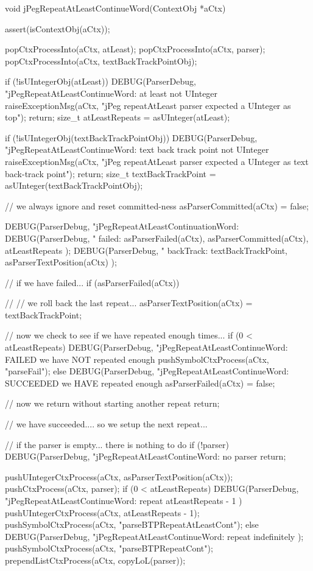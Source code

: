 \startCCode
void jPegRepeatAtLeastContinueWord(ContextObj *aCtx) {
  assert(isContextObj(aCtx));
  
  popCtxProcessInto(aCtx, atLeast);
  popCtxProcessInto(aCtx, parser);
  popCtxProcessInto(aCtx, textBackTrackPointObj);

  if (!isUIntegerObj(atLeast)) {
    DEBUG(ParserDebug,
      "jPegRepeatAtLeastContinueWord: at least not UInteger%
    raiseExceptionMsg(aCtx,
      "jPeg repeatAtLeast parser expected a UInteger as top");
    return;
  }
  size_t atLeastRepeats = asUInteger(atLeast);

  if (!isUIntegerObj(textBackTrackPointObj)) {
    DEBUG(ParserDebug,
      "jPegRepeatAtLeastContinueWord: text back track point not UInteger%
    raiseExceptionMsg(aCtx,
      "jPeg repeatAtLeast parser expected a UInteger as text back-track point");
    return;
  }
  size_t textBackTrackPoint = asUInteger(textBackTrackPointObj);

  // we always ignore and reset committed-ness
  asParserCommitted(aCtx) = false;

  DEBUG(ParserDebug,
    "jPegRepeatAtLeastContinuationWord:%
  DEBUG(ParserDebug,
    "  failed: %
    asParserFailed(aCtx), asParserCommitted(aCtx),
    atLeastRepeats
  );
  DEBUG(ParserDebug,
    "  backTrack: %
    textBackTrackPoint, asParserTextPosition(aCtx)
  );
    
  // if we have failed...
  if (asParserFailed(aCtx)) {
    //
    // we roll back the last repeat...
    asParserTextPosition(aCtx) = textBackTrackPoint;
    
    // now we check to see if we have repeated enough times...
    if (0 < atLeastRepeats) {
      DEBUG(ParserDebug,
        "jPegRepeatAtLeastContinueWord: FAILED we have NOT repeated enough%
      pushSymbolCtxProcess(aCtx, "parseFail");
    } else {
      DEBUG(ParserDebug,
        "jPegRepeatAtLeastContinueWord: SUCCEEDED we HAVE repeated enough%
      asParserFailed(aCtx) = false;
    }
    
    // now we return without starting another repeat
    return;
  }
  
  // we have succeeded.... so we setup the next repeat...
  
  // if the parser is empty... there is nothing to do
  if (!parser) {
    DEBUG(ParserDebug, "jPegRepeatAtLeastContineWord: no parser%
    return;
  }

  pushUIntegerCtxProcess(aCtx, asParserTextPosition(aCtx));
  pushCtxProcess(aCtx, parser);
  if (0 < atLeastRepeats) {
    DEBUG(ParserDebug,
      "jPegRepeatAtLeastContinueWord: repeat %
      atLeastRepeats - 1
    )
    pushUIntegerCtxProcess(aCtx, atLeastRepeats - 1);
    pushSymbolCtxProcess(aCtx, "parseBTPRepeatAtLeastCont");
  } else {
    DEBUG(ParserDebug,
      "jPegRepeatAtLeastContinueWord: repeat indefinitely%
    );
    pushSymbolCtxProcess(aCtx, "parseBTPRepeatCont");
  }
  prependListCtxProcess(aCtx, copyLoL(parser));
}
\stopCCode

